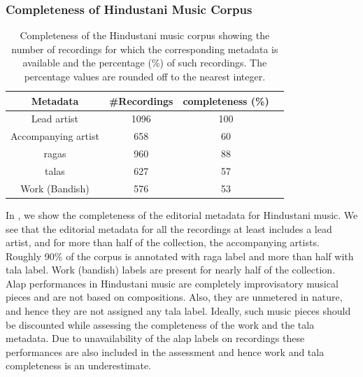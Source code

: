 \subsubsection{Completeness of Hindustani Music Corpus}
\label{sec:corpus_completeness_of_hindustani_music_corpus}

\begin{table}
	\begin{centering}
		\begin{tabular}{ c c c c}
			\hline
			Metadata	 		&  \#Recordings	& completeness (\%)\\
			\hline
			Lead artist			& 	1096	& 	100	\\						
			Accompanying artist	& 	658		& 	60	\\
			\Glspl{raga}		& 	960		& 	88	\\
			\Glspl{tala}		& 	627		& 	57	\\
			Work (Bandish)		& 	576		& 	53	\\
			
			\hline
			
		\end{tabular}
		\par \end{centering}	
	\caption[Completeness of the Hindustani music corpus]{Completeness of the Hindustani music corpus showing the number of recordings for which the corresponding metadata is available and the percentage (\%) of such recordings. The percentage values are rounded off to the nearest integer.} 
	\label{tab:completeness_hindustani_corpus}
\end{table}


In , we show the completeness of the editorial metadata for Hindustani music. We see that the editorial metadata for all the recordings at least includes a lead artist, and for more than half of the collection, the accompanying artists. Roughly 90\% of the corpus is annotated with \gls{raga} label and more than half with \gls{tala} label. Work (bandish) labels are present for nearly half of the collection. \gls{Alap} performances in Hindustani music are completely improvisatory musical pieces and are not based on compositions. Also, they are unmetered in nature, and hence they are not assigned any \gls{tala} label. Ideally, such music pieces should be discounted while assessing the completeness of the work  and the \gls{tala} metadata. Due to unavailability of the \gls{alap} labels on recordings these performances are also included in the assessment and hence work and \gls{tala} completeness is an underestimate.




